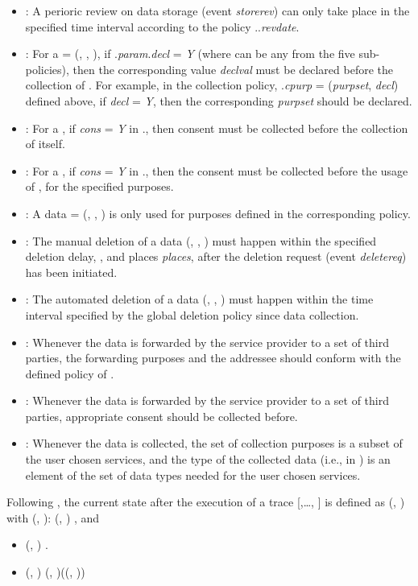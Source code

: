 \documentclass[a4paper]{article}
\begin{document}
\begin{itemize}
\item : A perioric review on data storage (event \textit{storerev}) can only take place in the specified time interval according to the policy ..\textit{revdate}.   
\item : For a  = (, , ), if  .\textit{param}.\textit{decl} = \textit{Y} (where  can be any from the five sub-policies), then the corresponding value \textit{declval} must be declared before the collection of . For example, in the collection policy, .\textit{cpurp} = (\textit{purpset}, \textit{decl}) defined above, if  \textit{decl} = \textit{Y}, then the corresponding \textit{purpset} should be declared.   
\item : For a , if \textit{cons} = \textit{Y} in ., then consent must be collected before the collection of  itself.   
\item : For a , if \textit{cons} = \textit{Y} in ., then the consent must be collected before the usage of , for the specified purposes. 
\item : A data  = (, , ) is only used for purposes defined in the corresponding policy. 
\item : The manual deletion of a data   (, , ) must happen within the specified deletion delay, , and places \textit{places},   
after the deletion request (event \textit{deletereq}) has been initiated.
\item : The automated deletion of a data   (, , ) must happen  within the time interval specified by the global deletion policy since data collection. 
\item : Whenever the data  is forwarded by the service provider to a set of third parties, the forwarding purposes and the addressee should conform with the defined policy of .  
\item : Whenever the data  is forwarded by the service provider to a set of third parties, appropriate consent should be collected before.    
\item : Whenever the data  is collected, the set of collection purposes is a subset of the user chosen services, and the type of the collected data (i.e.,  in ) is an element of the set of data types needed for the user chosen services.    
\end{itemize}
  
Following \cite{TaButin15}, the current state after the execution of a trace   [,\dots, ] is 
defined as (, ) with  (,   ):
(,   )  , and 

\begin{itemize} 
\item (, )  .
\item (, )  (, )((, ))  
\end{itemize} 
\end{document}
